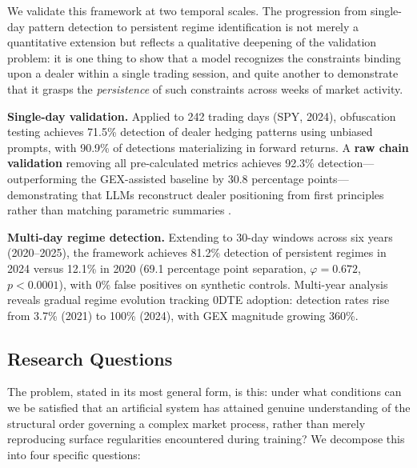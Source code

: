 We validate this framework at two temporal scales. The progression from single-day pattern detection to persistent regime identification is not merely a quantitative extension but reflects a qualitative deepening of the validation problem: it is one thing to show that a model recognizes the constraints binding upon a dealer within a single trading session, and quite another to demonstrate that it grasps the \textit{persistence} of such constraints across weeks of market activity.

\textbf{Single-day validation.} Applied to 242 trading days (SPY, 2024), obfuscation testing achieves 71.5\% detection of dealer hedging patterns using unbiased prompts, with 90.9\% of detections materializing in forward returns. A \textbf{raw chain validation} removing all pre-calculated metrics achieves 92.3\% detection---outperforming the GEX-assisted baseline by 30.8 percentage points---demonstrating that LLMs reconstruct dealer positioning from first principles rather than matching parametric summaries \citep{regan2025obfuscation}.

\textbf{Multi-day regime detection.} Extending to 30-day windows across six years (2020--2025), the framework achieves 81.2\% detection of persistent regimes in 2024 versus 12.1\% in 2020 (69.1 percentage point separation, $\varphi = 0.672$, $p < 0.0001$), with 0\% false positives on synthetic controls. Multi-year analysis reveals gradual regime evolution tracking 0DTE adoption: detection rates rise from 3.7\% (2021) to 100\% (2024), with GEX magnitude growing 360\%.

\subsection{Research Questions}

The problem, stated in its most general form, is this: under what conditions can we be satisfied that an artificial system has attained genuine understanding of the structural order governing a complex market process, rather than merely reproducing surface regularities encountered during training? We decompose this into four specific questions:

